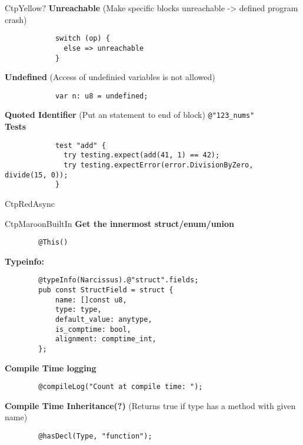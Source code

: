 \documentclass[10pt,a4paper]{article}
\begin{document}
\begin{multicols*}{3}
\begin{mycolorbox}{CtpYellow}{?}
			\textbf{Unreachable} (Make specific blocks unreachable -> defined program crash)
		\begin{verbatim}
			switch (op) {
			  else => unreachable
			}
		\end{verbatim}
	
			\textbf{Undefined} (Access of undefinied variables is not allowed)
		\begin{verbatim}
			var n: u8 = undefined;
		\end{verbatim}
	
			\textbf{Quoted Identifier} (Put an statement to end of block)
		\texttt{@"123_nums"}\\
			\textbf{Tests}
		\begin{verbatim}
			test "add" {
			  try testing.expect(add(41, 1) == 42);
			  try testing.expectError(error.DivisionByZero,                  divide(15, 0));
			}
		\end{verbatim}
\end{mycolorbox}


\begin{mycolorbox}{CtpRed}{Async}
\end{mycolorbox}

\begin{mycolorbox}{CtpMaroon}{BuiltIn}
	\textbf{Get the innermost struct/enum/union}
	\begin{verbatim}
		@This()
	\end{verbatim}
	
	\textbf{Typeinfo:}
	\begin{verbatim}
		@typeInfo(Narcissus).@"struct".fields;
		pub const StructField = struct {
			name: []const u8,
			type: type,
			default_value: anytype,
			is_comptime: bool,
			alignment: comptime_int,
		};
	\end{verbatim}
	
	\textbf{Compile Time logging}
	\begin{verbatim}
		@compileLog("Count at compile time: ");
	\end{verbatim}
	
	\textbf{Compile Time Inheritance(?)} (Returns true if type has a method with given name)
	\begin{verbatim}
		@hasDecl(Type, "function");
	\end{verbatim}
	

\end{mycolorbox}
\end{multicols*}
\end{document}
